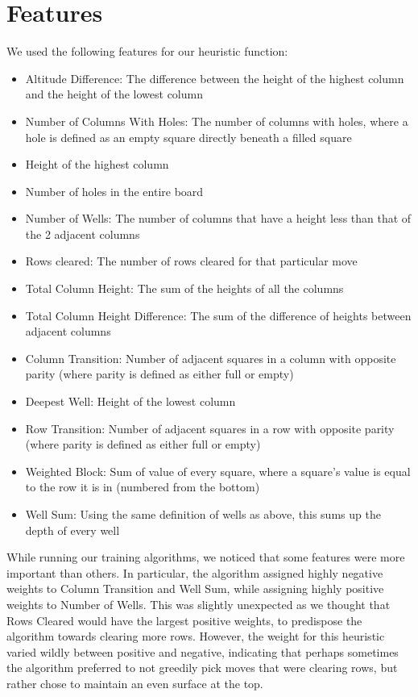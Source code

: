 \documentclass{article}
\begin{document}
    \section{Features}
    We used the following features for our heuristic function:
    \begin{itemize}
        \item Altitude Difference: The difference between the height of the highest
        column and the height of the lowest column
        \item Number of Columns With Holes: The number of columns with holes, where a hole
        is defined as an empty square directly beneath a filled square
        \item Height of the highest column
        \item Number of holes in the entire board
        \item Number of Wells: The number of columns that have a height less than that of the 2
        adjacent columns
        \item Rows cleared: The number of rows cleared for that particular move
        \item Total Column Height: The sum of the heights of all the columns
        \item Total Column Height Difference: The sum of the difference of heights between adjacent columns
        \item Column Transition: Number of adjacent squares in a column with opposite parity (where parity is defined as either full or empty)
        \item Deepest Well: Height of the lowest column
        \item Row Transition: Number of adjacent squares in a row with opposite parity (where parity is defined as either full or empty)
        \item Weighted Block: Sum of value of every square, where a square's value is equal to
		the row it is in (numbered from the bottom)
        \item Well Sum: Using the same definition of wells as above, this sums up
		the depth of every well
    \end{itemize}

    While running our training algorithms, we noticed that some features were more
	important than others. In particular, the algorithm assigned highly negative
	weights to Column Transition and Well Sum, while assigning highly positive
	weights to Number of Wells. This was slightly unexpected as we thought that
	Rows Cleared would have the largest positive weights, to predispose the algorithm
	towards clearing more rows. However, the weight for this heuristic varied wildly
	between positive and negative, indicating that perhaps sometimes the algorithm
	preferred to not greedily pick moves that were clearing rows, but rather chose
	to maintain an even surface at the top.
\end{document}
